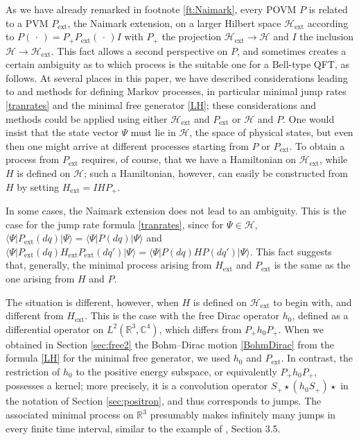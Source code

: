 \documentclass[12pt]{article}
\newcommand{\CCC}{\mathbb{C}} %
\newcommand{\RRR}{\mathbb{R}} %
\newcommand{\1}{\mathbf{1}} %
\newcommand{\Hilbert}{\mathscr{H}}
\renewcommand{\sp}[2]{\langle #1 | #2 \rangle} %
\newcommand{\pov}{{P}}%
\newcommand{\ext}{{\mathrm{ext}}} %
\begin{document}
As we have already remarked in footnote \ref{ft:Naimark}, every POVM
$\pov$ is related to a PVM $\pov_\ext$, the Naimark extension, on a
larger Hilbert space $\Hilbert_\ext$ according to $\pov(\,\cdot\,) =
P_+ \pov_\ext(\,\cdot\,) I$ with $P_+$ the projection $\Hilbert_\ext
\to \Hilbert$ and $I$ the inclusion $\Hilbert \to \Hilbert_\ext$. This
fact allows a second perspective on $\pov$, and sometimes creates a
certain ambiguity as to which process is the suitable one for a
Bell-type QFT, as follows.  At several places in this paper, we have
described considerations leading to and methods for defining Markov
processes, in particular minimal jump rates \eqref{tranrates} and the
minimal free generator \eqref{LH}; these considerations and methods
could be applied using either $\Hilbert_\ext$ and $\pov_\ext$ or
$\Hilbert$ and $\pov$. One would insist that the state vector $\Psi$
must lie in $\Hilbert$, the space of physical states, but even then
one might arrive at different processes starting from $\pov$ or
$\pov_\ext$. To obtain a process from $\pov_\ext$ requires, of course,
that we have a Hamiltonian on $\Hilbert_\ext$, while $H$ is defined on
$\Hilbert$; such a Hamiltonian, however, can easily be constructed
from $H$ by setting $H_\ext = I H P_+$.

In some cases, the Naimark extension does not lead to an ambiguity.
This is the case for the jump rate formula \eqref{tranrates}, since
for $\Psi \in \Hilbert$, $\sp{\Psi}{\pov_\ext(dq)| \Psi} =
\sp{\Psi}{\pov(dq) |\Psi}$ and $\sp{\Psi}{\pov_\ext(dq) H_\ext
\pov_\ext(dq')| \Psi} = \sp{\Psi}{\pov(dq) H \pov(dq') |\Psi}$. This
fact suggests that,  generally, the minimal process arising from
$H_\ext$ and $\pov_\ext$ is the same as the one arising from $H$ and
$\pov$.

The situation is different, however, when $H$ is defined on
$\Hilbert_\ext$ to begin with, and different from $H_\ext$. This is
the case with the free Dirac operator $h_0$, defined as a differential
operator on $L^2(\RRR^3,\CCC^4)$, which differs from $P_+h_0P_+$.
When we obtained in Section \ref{sec:free2} the Bohm--Dirac motion
\eqref{BohmDirac} from the formula \eqref{LH} for the minimal free
generator, we used $h_0$ and $\pov_\ext$. In contrast, the restriction
of $h_0$ to the positive energy subspace, or equivalently $P_+ h_0
P_+$, possesses a kernel; more precisely, it is a convolution operator
$S_+ \star (h_0 S_+) \star$ in the notation of Section
\ref{sec:positron}, and thus corresponds to jumps. The associated
minimal process on $\RRR^3$ presumably makes infinitely many jumps in
every finite time interval, similar to the example of \cite{crea2A}, 
Section
3.5.
\end{document}
